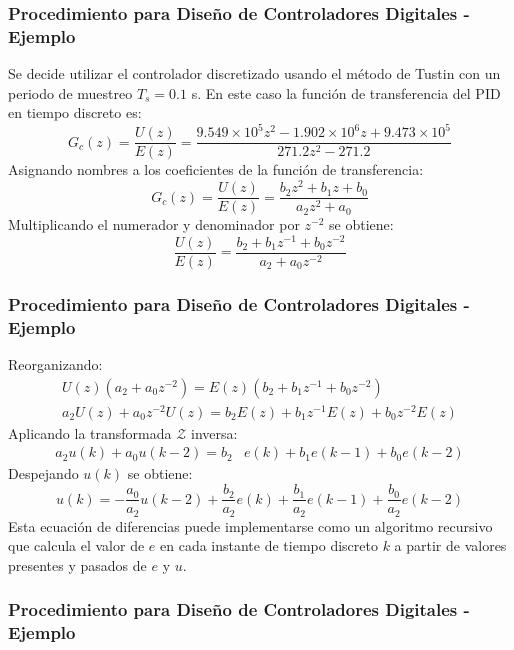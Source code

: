 \documentclass[aspectratio=169,handout]{beamer}
\theoremstyle{definition}
\theoremstyle{plain}
\theoremstyle{remark}
\begin{document}
\begin{frame}[c]\frametitle{Procedimiento para Diseño de Controladores Digitales - Ejemplo}
	Se decide utilizar el controlador discretizado usando el método de Tustin con un periodo de muestreo $T_s = 0.1$ s.
	\pause
	En este caso la función de transferencia del PID en tiempo discreto es:
	\begin{equation*}
		G_c(z) = \frac{U(z)}{E(z)} = \frac{9.549 \times 10^{5} z^2 - 1.902 \times  10^{6} z + 9.473 \times 10^{5}}{271.2 z^2 - 271.2}
	\end{equation*}
	\pause
	Asignando nombres a los coeficientes de la función de transferencia:
	\begin{equation*}
		G_c(z) = \frac{U(z)}{E(z)} = \frac{b_2 z^2 + b_1 z + b_0}{a_2 z^2 + a_0}
	\end{equation*}
	\pause
	Multiplicando el numerador y denominador por $z^{-2}$ se obtiene:
	\begin{equation*}
		\frac{U(z)}{E(z)} = \frac{b_2 + b_1 z^{-1} + b_0 z^{-2}}{a_2 + a_0 z^{-2}}
	\end{equation*}
\end{frame}

\begin{frame}[c]\frametitle{Procedimiento para Diseño de Controladores Digitales - Ejemplo}
	Reorganizando:
	\begin{align*}
		U(z)\left(a_2 + a_0 z^{-2}\right) = E(z)\left( b_2 + b_1 z^{-1} + b_0 z^{-2} \right)\\
		a_2 U(z) + a_0 z^{-2}U(z) = b_2 E(z) + b_1 z^{-1}E(z) + b_0 z^{-2}E(z)
	\end{align*}
	\pause
	Aplicando la transformada $\mathcal{Z}$ inversa:
	\begin{align*}
		a_2 u(k) + a_0 u(k-2) = b_2&e(k) + b_1 e(k-1) + b_0 e(k-2)
	\end{align*}
	\pause
	Despejando $u(k)$ se obtiene:
	\begin{equation*}
		u(k) = -\frac{a_0}{a_2}u(k-2) + \frac{b_2}{a_2} e(k) + \frac{b_1}{a_2} e(k-1) + \frac{b_0}{a_2} e(k-2)
	\end{equation*}
	\pause
	Esta ecuación de diferencias puede implementarse como un algoritmo recursivo que calcula el valor de $e$ en cada instante de tiempo discreto $k$ a partir de valores presentes y pasados de $e$ y $u$.
\end{frame}

\begin{frame}[c]\frametitle{Procedimiento para Diseño de Controladores Digitales - Ejemplo}
	
\end{frame}
\end{document}
